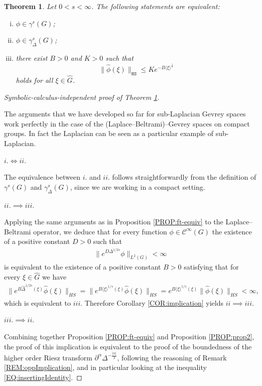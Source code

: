\documentclass[12pt,oneside,a4paper]{book}
\numberwithin{equation}{section}     %
\theoremstyle{plain}
\newtheorem{theorem}{Theorem}[section]
\theoremstyle{definition}
\newcommand{\HS}{{\mathtt{HS}}}
\newcommand{\Gh}{{\widehat{G}}}
\begin{document}
\begin{theorem}\label{THM:DR2014}
	Let $0<s<\infty$. The following statements are equivalent:
	\begin{enumerate}[i.]
		\item $\phi\in \gamma^s(G)$; 
		\item $\phi\in \gamma^s_\Delta(G)$; 
		\item there exist $B>0$ and $K>0$ such that
		\[
		\|\widehat {\phi}(\xi)\|_{\HS}\leq K e^{-B\langle\xi\rangle^{\frac{1}{s}}}
		\]
		holds for all $\xi\in\widehat G$.
	\end{enumerate}
\end{theorem}
\begin{proof}[Symbolic-calculus-independent proof of Theorem \ref{THM:DR2014}]~
	
	The arguments that we have developed so far for sub-Laplacian Gevrey spaces work perfectly in the case of the (Laplace--Beltrami)--Gevrey spaces on compact groups. In fact the Laplacian can be seen as a particular example of sub-Laplacian. 
	
	$i.\iff ii.$
	
	The equivalence between $i.$ and $ii.$ follows straightforwardly from the definition of $\gamma^s(G)$ and $\gamma_{\Delta}^s(G)$, since we are working in a compact setting.
	
	$ii.\implies iii.$
	
	Applying the same arguments as in Proposition \ref{PROP:ft-equiv} to the Laplace--Beltrami operator, we deduce that for every function $\phi\in\mathcal{C}^{\infty}(G)$ the existence of a positive constant $D>0$ such that
	\begin{align*}
	\|e^{D\Delta^{1/2s}}\phi\|_{L^2(G)}<\infty
	\end{align*}
	is equivalent to the existence of a positive constant $B>0$ satisfying that for every $\xi\in\Gh$ we have
	\begin{align*}
	\|e^{B\widehat{\Delta}^{1/2s}(\xi)}\widehat{\phi}(\xi)\|_{HS}= \|e^{B\langle \xi\rangle^{1/s}(\xi)}\widehat{\phi}(\xi)\|_{HS}=e^{B\langle \xi\rangle^{1/s}(\xi)}\|\widehat{\phi}(\xi)\|_{HS}<\infty,
	\end{align*}
	which is equivalent to $iii$. Therefore Corollary \ref{COR:implication} yields $ii\implies iii$.
	
	$iii.\implies ii.$
	
	Combining together Proposition \ref{PROP:ft-equiv} and Proposition \ref{PROP:prop2}, the proof of this implication is equivalent to the proof of the boundedness of the higher order Riesz transform $\partial^{\alpha}\Delta^{-\frac{|\alpha|}{2}}$, following the reasoning of Remark \ref{REM:oppImplication}, and in particular looking at the inequality \eqref{EQ:insertingIdentity}. 
	

\end{proof}
\end{document}
